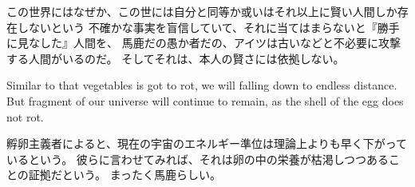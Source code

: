 \documentclass[autodetect-engine,dvipdfmx-if-dvi,a5paper,ja=standard,twoside,titlepage,final,twocolumn]{ltjtbook}
\begin{document}
この世界にはなぜか、この世には自分と同等か或いはそれ以上に賢い人間しか存在しないという
不確かな事実を盲信していて、それに当てはまらないと『勝手に見なした』人間を、
馬鹿だの愚か者だの、アイツは古いなどと不必要に攻撃する人間がいるのだ。
そしてそれは、本人の賢さには依拠しない。

Similar to that vegetables is got to rot, we will falling down to endless distance.
But fragment of our universe will continue to remain, as the shell of the egg does not rot.

孵卵主義者によると、現在の宇宙のエネルギー準位は理論上よりも早く下がっているという。
彼らに言わせてみれば、それは卵の中の栄養が枯渇しつつあることの証拠だという。
まったく馬鹿らしい。
\end{document}
